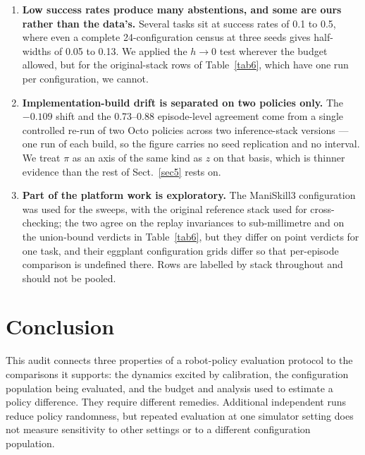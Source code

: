 \documentclass[pdflatex,iicol,sn-apa]{sn-jnl}
\theoremstyle{remark}
\begin{document}
\begin{enumerate}
\item \textbf{Low success rates produce many abstentions, and some are ours rather than the data's.}
Several tasks sit at success rates of 0.1 to 0.5, where even a complete 24-configuration census at
three seeds gives half-widths of 0.05 to 0.13. We applied the $h \to 0$ test wherever the budget
allowed, but for the original-stack rows of Table~\ref{tab6}, which have one run per configuration,
we cannot.

\item \textbf{Implementation-build drift is separated on two policies only.} The $-0.109$ shift and
the 0.73--0.88 episode-level agreement come from a single controlled re-run of two Octo policies
across two inference-stack versions --- one run of each build, so the figure carries no seed
replication and no interval. We treat $\pi$ as an axis of the same kind as $z$ on that basis, which is
thinner evidence than the rest of Sect.~\ref{sec5} rests on.

\item \textbf{Part of the platform work is exploratory.} The ManiSkill3 configuration was used for
the sweeps, with the original reference stack used for cross-checking; the two agree on the replay
invariances to sub-millimetre and on the union-bound verdicts in Table~\ref{tab6}, but they differ on
point verdicts for one task, and their eggplant configuration grids differ so that per-episode
comparison is undefined there. Rows are labelled by stack throughout and should not be pooled.
\end{enumerate}

\section{Conclusion}\label{sec10}

This audit connects three properties of a robot-policy evaluation protocol to the comparisons it
supports: the dynamics excited by calibration, the configuration population being evaluated, and
the budget and analysis used to estimate a policy difference. They require different remedies.
Additional independent runs reduce policy randomness, but repeated evaluation at one simulator
setting does not measure sensitivity to other settings or to a different configuration population.
\end{document}
